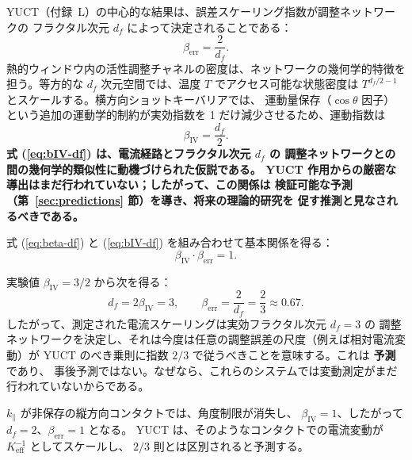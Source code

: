 \documentclass[12pt,a4paper]{article}
\newcommand{\Keff}{K_{\mathrm{eff}}}
\theoremstyle{remark}
\begin{document}
	YUCT（付録~L）の中心的な結果は、誤差スケーリング指数が調整ネットワークの
	フラクタル次元 $d_f$ によって決定されることである：
	\begin{equation}
		\beta_{\mathrm{err}} = \frac{2}{d_f}.
		\label{eq:beta-df}
	\end{equation}
	熱的ウィンドウ内の活性調整チャネルの密度は、ネットワークの幾何学的特徴を
	担う。等方的な $d_f$ 次元空間では、温度 $T$ でアクセス可能な状態密度は
	$T^{d_f/2 - 1}$ とスケールする。横方向ショットキーバリアでは、
	運動量保存（$\cos\theta$ 因子）という追加の運動学的制約が実効指数を
	1 だけ減少させるため、運動指数は
	\begin{equation}
		\beta_{\mathrm{IV}} = \frac{d_f}{2}.
		\label{eq:bIV-df}
	\end{equation}
	\textbf{式 (\ref{eq:bIV-df}) は、電流経路とフラクタル次元 $d_f$ の
		調整ネットワークとの間の幾何学的類似性に動機づけられた仮説である。
		YUCT 作用からの厳密な導出はまだ行われていない；したがって、この関係は
		検証可能な予測（第~\ref{sec:predictions} 節）を導き、将来の理論的研究を
		促す推測と見なされるべきである。}
	
	式 (\ref{eq:beta-df}) と (\ref{eq:bIV-df}) を組み合わせて基本関係を得る：
	\begin{equation}
		\boxed{\beta_{\mathrm{IV}} \cdot \beta_{\mathrm{err}} = 1}.
		\label{eq:relation}
	\end{equation}
	
	実験値 $\beta_{\mathrm{IV}} = 3/2$ から次を得る：
	\begin{equation}
		d_f = 2\beta_{\mathrm{IV}} = 3, \qquad
		\beta_{\mathrm{err}} = \frac{2}{d_f} = \frac{2}{3} \approx 0.67.
	\end{equation}
	したがって、測定された電流スケーリングは実効フラクタル次元 $d_f = 3$ の
	調整ネットワークを決定し、それは今度は任意の調整誤差の尺度（例えば相対電流変動）が
	YUCT のべき乗則に指数 $2/3$ で従うべきことを意味する。これは \textbf{予測} であり、
	事後予測ではない。なぜなら、これらのシステムでは変動測定がまだ行われていないからである。
	
	$k_\parallel$ が非保存の縦方向コンタクトでは、角度制限が消失し、
	$\beta_{\mathrm{IV}} = 1$、したがって $d_f = 2$、$\beta_{\mathrm{err}} = 1$ となる。
	YUCT は、そのようなコンタクトでの電流変動が $\Keff^{-1}$ としてスケールし、
	$2/3$ 則とは区別されると予測する。
	
\end{document}
